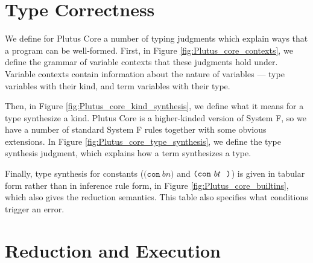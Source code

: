 \documentclass[conference]{IEEEtran}
\newcommand{\keyword}[1]{\texttt{#1}}
\newcommand{\construct}[1]{\texttt{(} #1 \texttt{)}}
\newcommand{\con}[1]{\construct{\keyword{con} ~ #1}}
\newcommand{\conT}[2]{\construct{\keyword{con} ~ #1 ~ #2}}
\begin{document}




%








\section{Type Correctness}

We define for Plutus Core a number of typing judgments which explain ways that a program can be well-formed. First, in Figure \ref{fig:Plutus_core_contexts}, we define the grammar of variable contexts that these judgments hold under. Variable contexts contain information about the nature of variables --- type variables with their kind, and term variables with their type.

Then, in Figure \ref{fig:Plutus_core_kind_synthesis}, we define what it means for a type synthesize a kind. Plutus Core is a higher-kinded version of System F, so we have a number of standard System F rules together with some obvious extensions. In Figure \ref{fig:Plutus_core_type_synthesis}, we define the type synthesis judgment, which explains how a term synthesizes a type.

Finally, type synthesis for constants ($\con{bn}$ and $\conT{bt}$) is given in tabular form rather than in inference rule form, in Figure \ref{fig:Plutus_core_builtins}, which also gives the reduction semantics. This table also specifies what conditions trigger an error.
















\section{Reduction and Execution}
\end{document}
